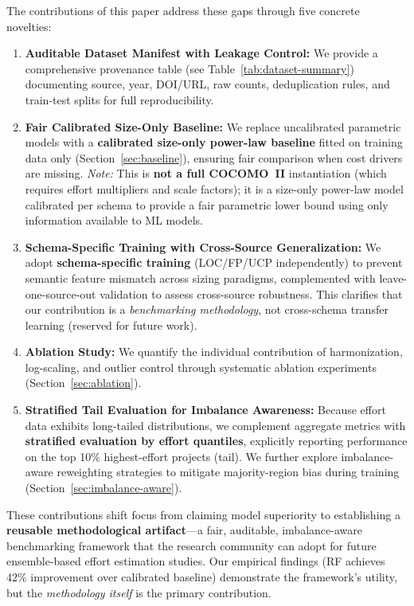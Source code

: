 \documentclass{ieeeaccess}
\begin{document}
\noindent The contributions of this paper address these gaps through five concrete novelties:
\begin{enumerate}[leftmargin=2em]
    \item \textbf{Auditable Dataset Manifest with Leakage Control:} We provide a comprehensive provenance table (see Table~\ref{tab:dataset-summary}) documenting source, year, DOI/URL, raw counts, deduplication rules, and train-test splits for full reproducibility.
    \item \textbf{Fair Calibrated Size-Only Baseline:} We replace uncalibrated parametric models with a \textbf{calibrated size-only power-law baseline} fitted on training data only (Section~\ref{sec:baseline}), ensuring fair comparison when cost drivers are missing. \textit{Note:} This is \textbf{not a full COCOMO~II} instantiation (which requires effort multipliers and scale factors); it is a size-only power-law model calibrated per schema to provide a fair parametric lower bound using only information available to ML models.
    \item \textbf{Schema-Specific Training with Cross-Source Generalization:} We adopt \textbf{schema-specific training} (LOC/FP/UCP independently) to prevent semantic feature mismatch across sizing paradigms, complemented with leave-one-source-out validation to assess cross-source robustness. This clarifies that our contribution is a \emph{benchmarking methodology}, not cross-schema transfer learning (reserved for future work).
    \item \textbf{Ablation Study:} We quantify the individual contribution of harmonization, log-scaling, and outlier control through systematic ablation experiments (Section~\ref{sec:ablation}).
    \item \textbf{Stratified Tail Evaluation for Imbalance Awareness:} Because effort data exhibits long-tailed distributions, we complement aggregate metrics with \textbf{stratified evaluation by effort quantiles}, explicitly reporting performance on the top 10\% highest-effort projects (tail). We further explore imbalance-aware reweighting strategies to mitigate majority-region bias during training (Section~\ref{sec:imbalance-aware}).
\end{enumerate}

\noindent These contributions shift focus from claiming model superiority to establishing a \textbf{reusable methodological artifact}—a fair, auditable, imbalance-aware benchmarking framework that the research community can adopt for future ensemble-based effort estimation studies. Our empirical findings (RF achieves 42\% improvement over calibrated baseline) demonstrate the framework's utility, but the \emph{methodology itself} is the primary contribution.
\end{document}
